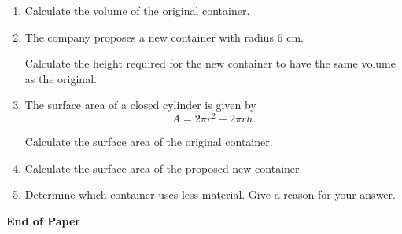 	\begin{enumerate}
		
		\item[(a)]
		Calculate the volume of the original container.
		
		\vspace{25mm}
		
		\item[(b)]
		The company proposes a new container with radius \(6\) cm.
		
		Calculate the height required for the new container to have the same volume as the original.
		
		\vspace{30mm}
		
		\item[(c)]
		The surface area of a closed cylinder is given by
		\[
		A=2\pi r^2+2\pi rh.
		\]
		
		Calculate the surface area of the original container.
		
		\vspace{25mm}
		
		\item[(d)]
		Calculate the surface area of the proposed new container.
		
		\vspace{25mm}
		
		\item[(e)]
		Determine which container uses less material. Give a reason for your answer.
		
	\end{enumerate}
	
	\vfill
	
	\begin{center}
		\textbf{End of Paper}
	\end{center}
	
